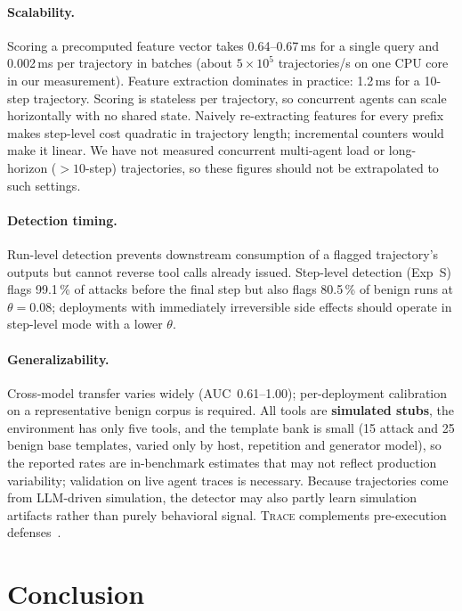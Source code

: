 \documentclass[conference]{IEEEtran}
\begin{document}
\paragraph{Scalability.}
Scoring a precomputed feature vector takes 0.64--0.67\,ms for a single
query and 0.002\,ms per trajectory in batches (about
$5{\times}10^{5}$ trajectories/s on one CPU core in our measurement).
Feature extraction dominates in practice: 1.2\,ms for a 10-step
trajectory.  Scoring is stateless per trajectory, so concurrent agents
can scale horizontally with no shared state.  Naively re-extracting
features for every prefix makes step-level cost quadratic in
trajectory length; incremental counters would make it linear.  We have
not measured concurrent multi-agent load or long-horizon
(${>}10$-step) trajectories, so these figures should not be
extrapolated to such settings.

\paragraph{Detection timing.}
Run-level detection prevents downstream consumption of a flagged
trajectory's outputs but cannot reverse tool calls already issued.
Step-level detection (Exp~S) flags 99.1\,\% of attacks before the
final step but also flags 80.5\,\% of benign runs at $\theta{=}0.08$;
deployments with immediately irreversible side effects
should operate in step-level mode with a lower $\theta$.

\paragraph{Generalizability.}
Cross-model transfer varies widely (AUC~0.61--1.00); per-deployment
calibration on a representative benign corpus is required.  All
tools are \textbf{simulated stubs}, the environment has only five
tools, and the template bank is small (15 attack and 25 benign base
templates, varied only by host, repetition and generator model), so
the reported rates are in-benchmark estimates that may not reflect
production variability; validation on live agent traces is necessary.
Because trajectories come from LLM-driven simulation, the detector may
also partly learn simulation artifacts rather than purely behavioral
signal.
\textsc{Trace} complements pre-execution
defenses~\cite{hines2024spotlighting,inan2023llama}.

\section{Conclusion}
\label{sec:conclusion}
\end{document}
